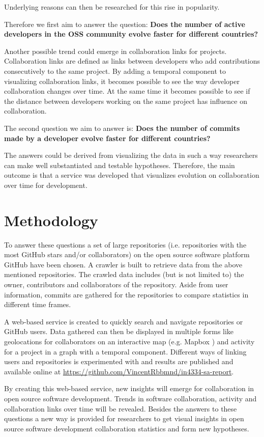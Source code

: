 \documentclass[acmtog, authorversion]{acmart}
\begin{document}
Underlying reasons can then be researched for this rise in popularity.

Therefore we first aim to answer the question: \textbf{Does the number of active developers in the OSS community evolve faster for different countries?}

Another possible trend could emerge in collaboration links for projects.
Collaboration links are defined as links between developers who add contributions consecutively to the same project.
By adding a temporal component to visualizing collaboration links, it becomes possible to see the way developer collaboration changes over time.
At the same time it becomes possible to see if the distance between developers working on the same project has influence on collaboration.

The second question we aim to answer is: \textbf{Does the number of commits made by a developer evolve faster for different countries?}

The answers could be derived from visualizing the data in such a way researchers can make well substantiated and testable hypotheses. 
Therefore, the main outcome is that a service was developed that visualizes evolution on collaboration over time for development.

\section{Methodology}
To answer these questions a set of large repositories (i.e. repositories with the most GitHub stars and/or collaborators) on the open source software platform GitHub have been chosen.
A crawler is built to retrieve data from the above mentioned repositories.
The crawled data includes (but is not limited to) the owner, contributors and collaborators of the repository.
Aside from user information, commits are gathered for the repositories to compare statistics in different time frames.

A web-based service is created to quickly search and navigate repositories or GitHub users.
Data gathered can then be displayed in multiple forms like geolocations for collaborators on an interactive map (e.g. Mapbox \cite{MapBox}) and activity for a project in a graph with a temporal component.
Different ways of linking users and repositories is experimented with and results are published and available online at \url{https://github.com/VincentRbbmnd/in4334-sa-report}.

By creating this web-based service, new insights will emerge for collaboration in open source software development.
Trends in software collaboration, activity and collaboration links over time will be revealed.
Besides the answers to these questions a new way is provided for researchers to get visual insights in open source software development collaboration statistics and form new hypotheses.
\end{document}
